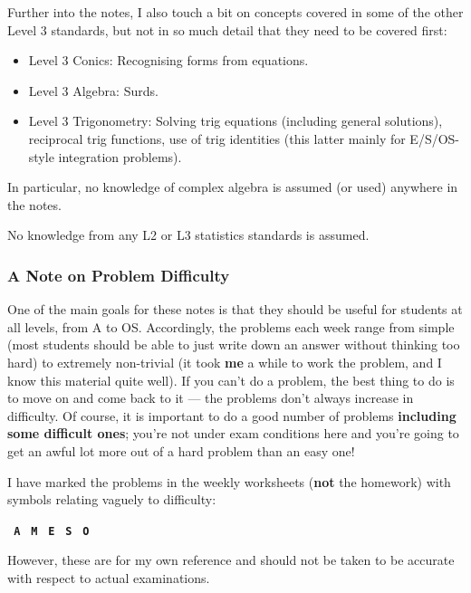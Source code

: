 Further into the notes, I also touch a bit on concepts covered in some of the other Level 3 standards,
but not in so much detail that they need to be covered first:
\begin{itemize}
  \item Level 3 Conics: Recognising forms from equations.
  \item Level 3 Algebra: Surds.
  \item Level 3 Trigonometry: Solving trig equations (including general solutions), reciprocal trig functions, use
                              of trig identities (this latter mainly for E/S/OS-style integration problems).
\end{itemize}
In particular, no knowledge of complex algebra is assumed (or used) anywhere in the notes.

No knowledge from any L2 or L3 statistics standards is assumed.

\subsubsection*{A Note on Problem Difficulty}
One of the main goals for these notes is that they should be useful for students at all levels, from A to OS. Accordingly, the
problems each week range from simple (most students should be able to just write down an answer without thinking too hard) to
extremely non-trivial (it took \textbf{me} a while to work the problem, and I know this material quite well). If you can't do
a problem, the best thing to do is to move on and come back to it --- the problems don't always increase in difficulty. Of course,
it is important to do a good number of problems \textbf{including some difficult ones}; you're not under exam conditions here
and you're going to get an awful lot more out of a hard problem than an easy one!

I have marked the problems in the weekly worksheets (\textbf{not} the homework) with symbols relating vaguely to difficulty:

\begin{center}
\texttt{\textbf{\color{Cerulean} A}}
\texttt{\textbf{\color{PineGreen} M}}
\texttt{\textbf{\color{WildStrawberry} E}}
\texttt{\textbf{\color{Goldenrod} S}}
\texttt{\textbf{\color{BurntOrange} O}}
\end{center}

However, these are for my own reference and should not be taken to be accurate with respect to actual examinations.

